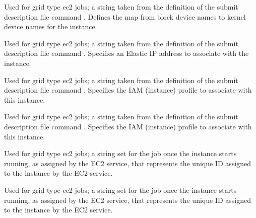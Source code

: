 \begin{description}
\item[\AdAttr{EC2BlockDeviceMapping}:] 
Used for grid type ec2 jobs;
a string taken from the definition of the submit description file command
.
Defines the map from block device names to kernel device names
for the instance.

\item[\AdAttr{EC2ElasticIp}:] 
Used for grid type ec2 jobs;
a string taken from the definition of the submit description file command
.
Specifies an Elastic IP address to associate with the instance.

\item[\AdAttr{EC2IamProfileArn}:]
Used for grid type ec2 jobs;
a string taken from the definition of the submit description file command
.
Specifies the IAM (instance) profile to associate with this instance.

\item[\AdAttr{EC2IamProfileName}:]
Used for grid type ec2 jobs;
a string taken from the definition of the submit description file command
.
Specifies the IAM (instance) profile to associate with this instance.

\item[\AdAttr{EC2InstanceName}:] 
Used for grid type ec2 jobs;
a string set for the job once the instance starts running, 
as assigned by the EC2 service, 
that represents the unique ID assigned to the instance by the EC2 service.


\item[\AdAttr{EC2InstanceName}:] 
Used for grid type ec2 jobs;
a string set for the job once the instance starts running, 
as assigned by the EC2 service, 
that represents the unique ID assigned to the instance by the EC2 service.


\end{description}
